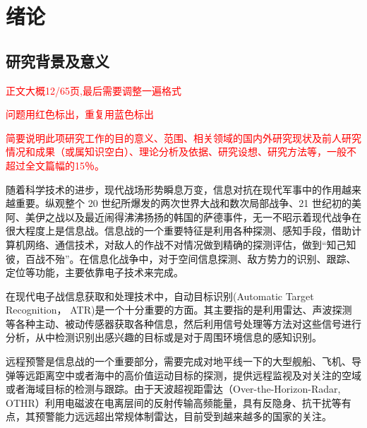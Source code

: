 \chapter{绪论}
\section{研究背景及意义}
\textcolor{red}{正文大概12/65页,最后需要调整一遍格式}

\textcolor{red}{问题用红色标出，重复用蓝色标出}

\textcolor{red}{简要说明此项研究工作的目的意义、范围、相关领域的国内外研究现状及前人研究情况和成果（或属知识空白）、理论分析及依据、研究设想、研究方法等，一般不超过全文篇幅的15％。}




随着科学技术的进步，现代战场形势瞬息万变，信息对抗在现代军事中的作用越来越重要。纵观整个 20 世纪所爆发的两次世界大战和数次局部战争、21 世纪初的美阿、美伊之战以及最近闹得沸沸扬扬的韩国的萨德事件，无一不昭示着现代战争在很大程度上是信息战。信息战的一个重要特征是利用各种探测、感知手段，借助计算机网络、通信技术，对敌人的作战不对情况做到精确的探测评估，做到“知己知彼，百战不殆”。在信息化战争中，对于空间信息探测、敌方势力的识别、跟踪、定位等功能，主要依靠电子技术来完成\cite{顾耀平2006电子战发展趋势分析, 孙德海2003国外电子战发展综述及对我国电子战研究的思考, 炜森1996综合电子战新技术新方法, 孙纪尧2014电子战}。

在现代电子战信息获取和处理技术中，自动目标识别(Automatic Target Recognition， ATR)是一个十分重要的方面。其主要指的是利用雷达、声波探测等各种主动、被动传感器获取各种信息，然后利用信号处理等方法对这些信号进行分析，从中检测识别出感兴趣的目标或是对于周围环境信息的感知识别。

远程预警是信息战的一个重要部分，需要完成对地平线一下的大型舰船、飞机、导弹等远距离空中或者海中的高价值运动目标的探测，提供远程监视及对关注的空域或者海域目标的检测与跟踪。由于天波超视距雷达（Over-the-Horizon-Radar, OTHR）利用电磁波在电离层间的反射传输高频能量，具有反隐身、抗干扰等有点，其预警能力远远超出常规体制雷达，目前受到越来越多的国家的关注。

